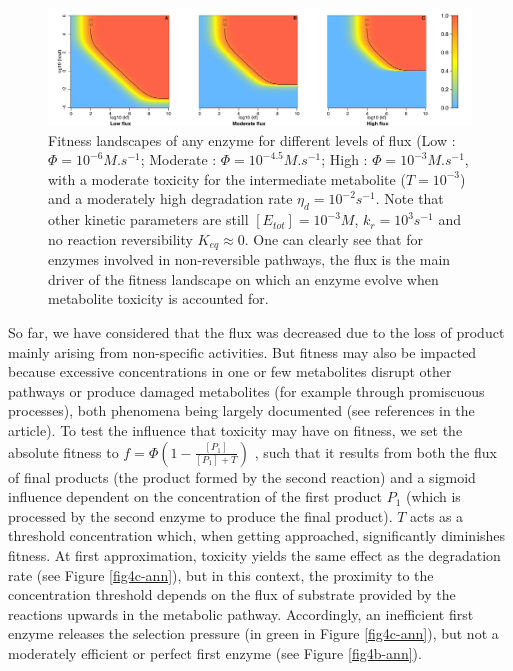 \begin{figure}[h!]
\centering
\includegraphics[scale=0.46,trim=0cm 0cm 0cm 0cm,clip]{pics/SM-Enzymes/2DFit_Landscape_2Enz_First_Enz_GenFlux&Tox.jpeg} 
\caption{Fitness landscapes of any enzyme for different levels of flux (Low : $\Phi=10^{-6}M.s^{-1}$; Moderate : $\Phi=10^{-4.5}M.s^{-1}$; High : $\Phi=10^{-3}M.s^{-1}$, with a moderate toxicity for the intermediate metabolite ($T=10^{-3}$) and a moderately high degradation rate $\eta_d=10^{-2}s^{-1}$. Note that other kinetic parameters are still $[E_{tot}]=10^{-3}M$, $k_r=10^3s^{-1}$ and no reaction reversibility $K_{eq} \approx 0$. One can clearly see that for enzymes involved in non-reversible pathways, the flux is the main driver of the fitness landscape on which an enzyme evolve when metabolite toxicity is accounted for.}
\label{fig4d-ann}
\end{figure}

So far, we have considered that the flux was decreased due to the loss of product mainly arising from non-specific activities. But fitness may also be impacted because excessive concentrations in one or few metabolites disrupt other pathways or produce damaged metabolites (for example through promiscuous processes), both phenomena being largely documented (see references in the article). To test the influence that toxicity may have on fitness, we set the absolute fitness to $f=\Phi (1-\frac{[P_1]}{[P_1]+T})$ \citep{Clark91}, such that it results from both the flux of final products (the product formed by the second reaction) and a sigmoid influence dependent on the concentration of the first product $P_1$ (which is processed by the second enzyme to produce the final product). $T$ acts as a threshold concentration which, when getting approached, significantly diminishes fitness. At first approximation, toxicity yields the same effect as the degradation rate (see Figure \ref{fig4c-ann}), but in this context, the proximity to the concentration threshold depends on the flux of substrate provided by the reactions upwards in the metabolic pathway. Accordingly, an inefficient first enzyme releases the selection pressure (in green in Figure \ref{fig4c-ann}), but not a moderately efficient or perfect first enzyme (see Figure \ref{fig4b-ann}).

